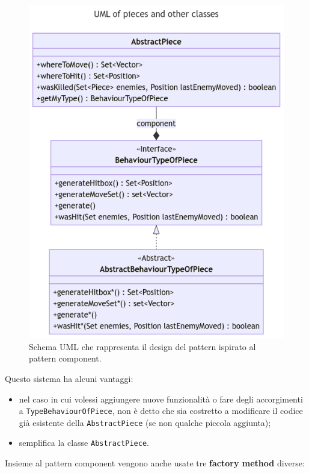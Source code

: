 \documentclass[a4paper,12pt]{report}
\begin{document}
\begin{figure}[H]
\centering
\includegraphics[width=\textwidth]{images/component-pattern.png}
\caption{Schema UML che rappresenta il design del pattern ispirato al pattern component.}
\label{images:component-pattern}
\end{figure}
Questo sistema ha alcuni vantaggi: 
\begin{itemize}
\item nel caso in cui volessi aggiungere nuove funzionalità o fare degli accorgimenti a \texttt{TypeBehaviourOfPiece}, non è detto che sia costretto a modificare il
codice già esistente della \texttt{AbstractPiece} (se non qualche piccola aggiunta);
\item semplifica la classe \texttt{AbstractPiece}.
\end{itemize}
Insieme al pattern component vengono anche usate tre \textbf{factory method} diverse:
\end{document}
